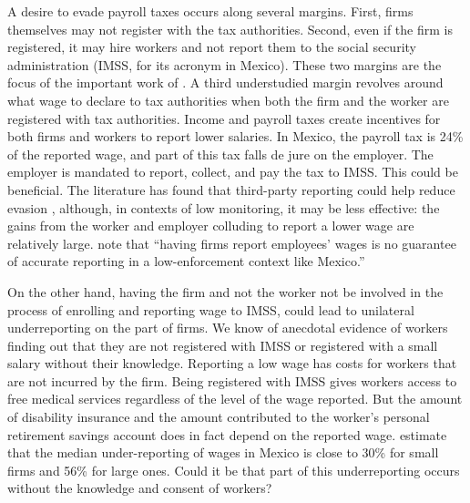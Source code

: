 \documentclass[oneside,11pt]{article}
\begin{document}
A desire to evade payroll taxes occurs along several margins. First, firms themselves may not register with the tax authorities. Second, even if the firm is registered, it may hire workers and not report them to the social security administration (IMSS, for its acronym in Mexico).%
These two margins are the focus of the important work of \cite{Ulyssea}. A third understudied margin revolves around what wage to declare to tax authorities when both the firm and the worker are registered with tax authorities. Income and payroll taxes create incentives for both firms and workers to report lower salaries. In Mexico, the payroll tax is 24\% of the reported wage, and part of this tax falls de jure on the employer. The employer is mandated to report, collect, and pay the tax to IMSS. This could be beneficial. The literature has found that third-party reporting could help reduce evasion \citep{Denmark}, although, in contexts of low monitoring, it may be less effective: the gains from the worker and employer colluding to report a lower wage are relatively large. \cite{kumler2020enlisting} note that ``having firms report employees’ wages is no guarantee of accurate reporting in a low-enforcement context like Mexico.'' %

On the other hand, having the firm and not the worker not be involved in the process of enrolling and reporting wage to IMSS, could lead to unilateral underreporting on the part of firms. We know of anecdotal evidence of workers finding out that they are not registered with IMSS or registered with a small salary without their knowledge. Reporting a low wage has costs for workers that are not incurred by the firm. Being registered with IMSS gives workers access to free medical services regardless of the level of the wage reported. But the amount of disability insurance and the amount contributed to the worker's personal retirement savings account does in fact depend on the reported wage. \cite{kumler2020enlisting} estimate that the median under-reporting of wages in Mexico is close to 30\% for small firms and 56\% for large ones. Could it be that part of this underreporting occurs without the knowledge and consent of workers? 
\end{document}
